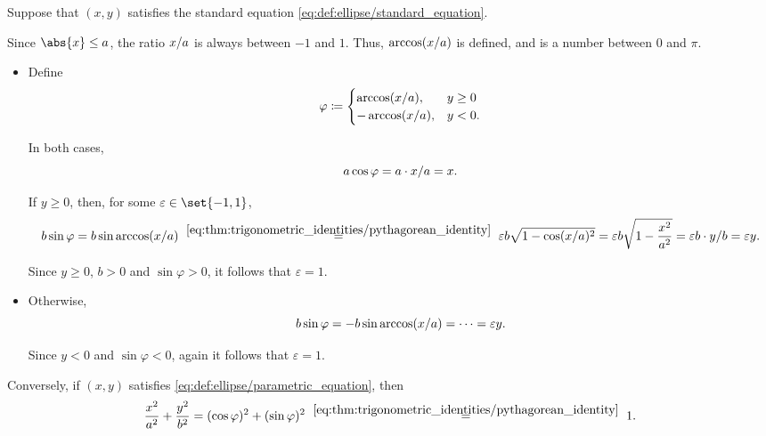 \begin{defproof}
   Suppose that \( (x, y) \) satisfies the standard equation \eqref{eq:def:ellipse/standard_equation}.

  Since \( \abs{x} \leq a \), the ratio \( \ifrac x a \) is always between \( -1 \) and \( 1 \). Thus, \( \arccos(\ifrac x a) \) is defined, and is a number between \( 0 \) and \( \pi \).

  \begin{itemize}
    \item Define
    \begin{equation*}
      \varphi \coloneqq \begin{cases}
        \arccos(\ifrac x a),  &y \geq 0 \\
        -\arccos(\ifrac x a), &y < 0.
      \end{cases}
    \end{equation*}

    In both cases,
    \begin{equation*}
      a \cos\varphi = a \cdot \ifrac x a = x.
    \end{equation*}

    If \( y \geq 0 \), then, for some \( \varepsilon \in \set{ -1, 1 } \),
    \begin{equation*}
      b \sin\varphi
      =
      b \sin\arccos(\ifrac x a)
      \reloset {\eqref{eq:thm:trigonometric_identities/pythagorean_identity}} =
      \varepsilon b \sqrt{ 1 - \cos(\ifrac x a)^2 }
      =
      \varepsilon b \sqrt{ 1 - \frac {x^2} {a^2} }
      =
      \varepsilon b \cdot \ifrac y b
      =
      \varepsilon y.
    \end{equation*}

    Since \( y \geq 0 \), \( b > 0 \) and \( \sin\varphi > 0 \), it follows that \( \varepsilon = 1 \).

    \item Otherwise,
    \begin{equation*}
      b \sin\varphi
      =
      -b \sin\arccos(\ifrac x a)
      =
      \cdots
      =
      \varepsilon y.
    \end{equation*}

    Since \( y < 0 \) and \( \sin\varphi < 0 \), again it follows that \( \varepsilon = 1 \).
  \end{itemize}

   Conversely, if \( (x, y) \) satisfies \eqref{eq:def:ellipse/parametric_equation}, then
  \begin{equation*}
    \frac {x^2} {a^2} + \frac {y^2} {b^2}
    =
    (\cos \varphi)^2 + (\sin \varphi)^2
    \reloset {\eqref{eq:thm:trigonometric_identities/pythagorean_identity}} =
    1.
  \end{equation*}


\end{defproof}
